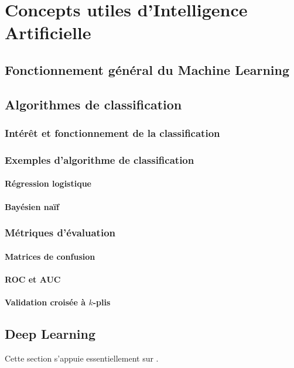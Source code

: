 \chapter{Concepts utiles d'Intelligence Artificielle}
    \section{Fonctionnement général du Machine Learning}

    \section{Algorithmes de classification}
        \subsection{Intérêt et fonctionnement de la classification}
        \subsection{Exemples d'algorithme de classification}
            \subsubsection{Régression logistique}
            \subsubsection{Bayésien naïf}
        \subsection{Métriques d'évaluation}
            \subsubsection{Matrices de confusion}
            \subsubsection{ROC et AUC}
            \subsubsection{Validation croisée à $k$-plis}
    \section{Deep Learning}
        Cette section s'appuie essentiellement sur \cite{UDL}.
